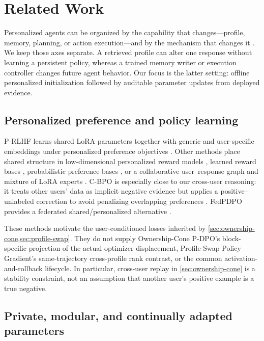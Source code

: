 \section{Related Work}
\label{sec:related-work}

Personalized agents can be organized by the capability that changes---profile,
memory, planning, or action execution---and by the mechanism that changes it
\citep{xu2026personalizedagents}.  We keep those axes separate.  A retrieved
profile can alter one response without learning a persistent policy, whereas a
trained memory writer or execution controller changes future agent behavior.
Our focus is the latter setting: offline personalized initialization followed
by auditable parameter updates from deployed evidence.

\subsection{Personalized preference and policy learning}

P-RLHF learns shared LoRA parameters together with generic and user-specific
embeddings under personalized preference objectives
\citep{li2024personalized}.  Other methods place shared structure in
low-dimensional personalized reward models \citep{liu2025sharedlora}, learned
reward bases \citep{shenfeld2025reward}, probabilistic preference bases
\citep{lee2026vrf}, or a collaborative user--response graph and mixture of
LoRA experts \citep{choi2025copl}.  C-BPO is especially close to our
cross-user reasoning: it treats other users' data as implicit negative
evidence but applies a positive--unlabeled correction to avoid penalizing
overlapping preferences \citep{ma2026cbpo}.  FedPDPO provides a federated
shared/personalized alternative \citep{zhu2026fedpdpo}.

These methods motivate the user-conditioned losses inherited by
\cref{sec:ownership-cone,sec:profile-swap}.  They do not supply
Ownership-Cone P-DPO's block-specific projection of the actual optimizer
displacement, Profile-Swap Policy Gradient's same-trajectory cross-profile
rank contrast, or the common activation-and-rollback lifecycle.  In
particular, cross-user replay in \cref{sec:ownership-cone} is a stability
constraint, not an assumption that another user's positive example is a true
negative.

\subsection{Private, modular, and continually adapted parameters}

